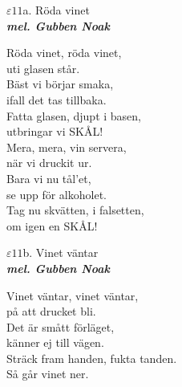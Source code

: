\documentclass[a6paper,10pt]{article}
\newcommand{\mel}[1]{\small\textbf{\textit{mel. #1 \\}}}
\begin{document}
\setlength{\oddsidemargin}{-0.47in}
\noindent
\begin{center}
\Large $\varepsilon11$a. Röda vinet\\ 
\mel{Gubben Noak}
\end{center}
Röda vinet, röda vinet,\\
uti glasen står.\\
Bäst vi börjar smaka,\\
ifall det tas tillbaka.\\
Fatta glasen, djupt i basen,\\
utbringar vi SKÅL!
\vspace{5pt}\\
Mera, mera, vin servera,\\
när vi druckit ur.\\
Bara vi nu tål'et,\\
se upp för alkoholet.\\
Tag nu skvätten, i falsetten,\\
om igen en SKÅL!
\vspace{40pt}
\begin{center}
\Large $\varepsilon11$b. Vinet väntar \\ 
\mel{Gubben Noak}
\end{center}
Vinet väntar, vinet väntar,\\
på att drucket bli.\\
Det är smått förläget,\\
känner ej till vägen.\\
Sträck fram handen, fukta tanden.\\
Så går vinet ner.
\end{document}
